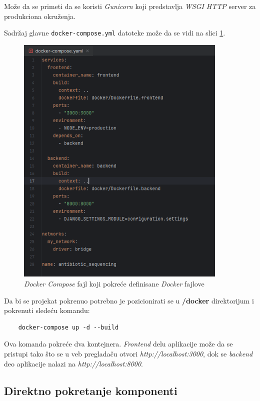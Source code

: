 \documentclass[12pt,oneside]{memoir}
\begin{document}
Može da se primeti da se koristi \emph{Gunicorn} koji predstavlja \emph{WSGI HTTP} server za produkciona okruženja.

Sadržaj glavne \texttt{docker-compose.yml} datoteke može da se vidi na slici \ref{fig:docker_compose}.

\begin{figure}[h]
\centering
\includegraphics[width=0.9\textwidth]{images/docker_compose.png}
\caption{\emph{Docker Compose} fajl koji pokreće definisane \emph{Docker} fajlove}
\label{fig:docker_compose}
\end{figure}

Da bi se projekat pokrenuo potrebno je pozicionirati se u \textbf{/docker} direktorijum i pokrenuti sledeću komandu:
\begin{verbatim}
    docker-compose up -d --build
\end{verbatim}

Ova komanda pokreće dva kontejnera. \emph{Frontend} delu aplikacije može da se pristupi tako što se u veb pregladaču otvori \emph{http://localhost:3000}, dok se \emph{backend} deo aplikacije nalazi na \emph{http://localhost:8000}.

\subsection{Direktno pokretanje komponenti}
\end{document}
